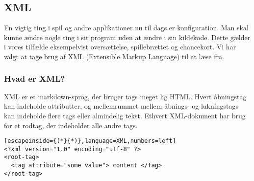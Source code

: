 \documentclass[../../main.tex]{subfiles}
\begin{document}
\begin{flushleft}
\subsection{XML}
En vigtig ting i spil og andre applikationer nu til dags er konfiguration. Man skal kunne ændre nogle ting i sit program uden at ændre i sin kildekode. Dette gælder i vores tilfælde eksempelvist oversættelse, spillebrættet og chancekort. Vi har valgt at tage brug af XML (Extensible Markup Language) til at læse fra. 

\subsubsection{Hvad er XML?}
XML er et markdown-sprog, der bruger tags meget lig HTML. Hvert åbningstag kan indeholde attributter, og mellemrummet mellem åbnings- og lukningstags kan indeholde flere tags eller almindelig tekst. Ethvert XML-dokument har brug for et rodtag, der indeholder alle andre tags.


\begin{lstlisting}[escapeinside={(*}{*)},language=XML,numbers=left]
<?xml version="1.0" encoding="utf-8" ?>
<root-tag> 
  <tag attribute="some value"> content </tag>
</root-tag>
\end{lstlisting}
\end{flushleft}
\end{document}
